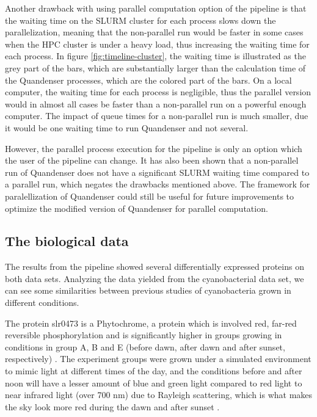 Another drawback with using parallel computation option of the pipeline is that the waiting time on the SLURM cluster for each process slows down the parallelization, meaning that the non-parallel run would be faster in some cases when the HPC cluster is under a heavy load, thus increasing the waiting time for each process. In figure \ref{fig:timeline-cluster}, the waiting time is illustrated as the grey part of the bars, which are substantially larger than the calculation time of the Quandenser processes, which are the colored part of the bars. On a local computer, the waiting time for each process is negligible, thus the parallel version would in almost all cases be faster than a non-parallel run on a powerful enough computer. The impact of queue times for a non-parallel run is much smaller, due it would be one waiting time to run Quandenser and not several.

However, the parallel process execution for the pipeline is only an option which the user of the pipeline can change. It has also been shown that a non-parallel run of Quandenser does not have a significant SLURM waiting time compared to a parallel run, which negates the drawbacks mentioned above. The framework for paralellization of Quandenser could still be useful for future improvements to optimize the modified version of Quandenser for parallel computation.

\subsection{The biological data}
The results from the pipeline showed several differentially expressed proteins on both data sets. Analyzing the data yielded from the cyanobacterial data set, we can see some similarities between previous studies of cyanobacteria grown in different conditions.

The protein slr0473 is a Phytochrome, a protein which is involved red, far-red reversible phosphorylation and is significantly higher in groups growing in conditions in group A, B and E (before dawn, after dawn and after sunset, respectively) \cite{phytochrome}. The experiment groups were grown under a simulated environment to mimic light at different times of the day, and the conditions before and after noon will have a lesser amount of blue and green light compared to red light to near infrared light (over 700 nm) due to Rayleigh scattering, which is what makes the sky look more red during the dawn and after sunset \cite{rayleigh}.

